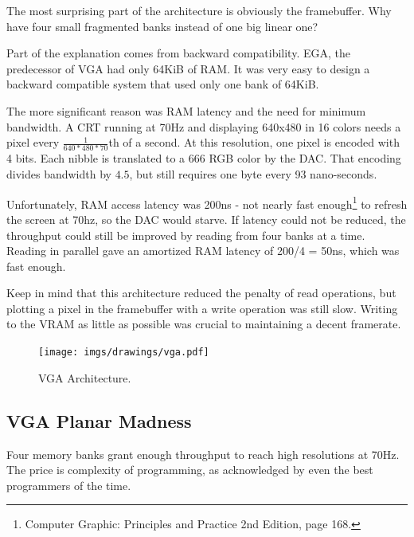 \documentclass[book.tex]{subfiles}
\begin{document}
The most surprising part of the architecture is obviously the framebuffer. Why have four small fragmented banks instead of one big linear one?\\
\par
Part of the explanation comes from backward compatibility. EGA, the predecessor of VGA had only 64KiB of RAM. It was very easy to design a backward compatible system that used only one bank of 64KiB.\\
\par
The more significant reason was RAM latency and the need for minimum bandwidth. A CRT running at 70Hz and displaying 640x480 in 16 colors needs a pixel every $\frac{1}{640*480*70}$th of a second. At this resolution, one pixel is encoded with 4 bits. Each nibble is translated to a 666 RGB color by the DAC. That encoding divides bandwidth by $4.5$, but still requires one byte every 93 nano-seconds.\\
\par
 Unfortunately, RAM access latency was 200ns - not nearly fast enough\footnote{Computer Graphic: Principles and Practice 2nd Edition, page 168.} to refresh the screen at 70hz, so the DAC would starve. If latency could not be reduced, the throughput could still be improved by reading from four banks at a time. Reading in parallel gave an amortized RAM latency of 200/4 = 50ns, which was fast enough.\\
\par
Keep in mind that this architecture reduced the penalty of read operations, but plotting a pixel in the framebuffer with a write operation was still slow. Writing to the VRAM as little as possible was crucial to maintaining a decent framerate. 


\begin{figure}[H]
\centering
\texttt{[image: imgs/drawings/vga.pdf]}
\caption{VGA Architecture.}
\label{fig:vga_arch}
\end{figure}




\subsection{VGA Planar Madness}

Four memory banks grant enough throughput to reach high resolutions at 70Hz. The price is complexity of programming, as acknowledged by even the best programmers of the time.\\
\end{document}
